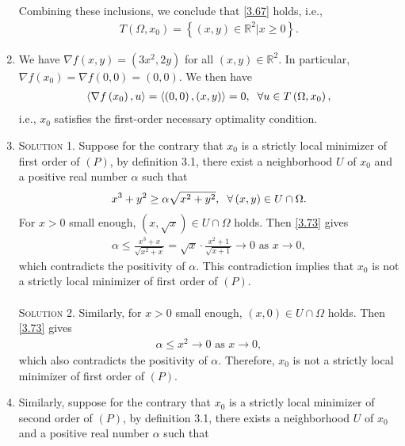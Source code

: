 \documentclass[a4paper]{article}
\numberwithin{equation}{section}
\begin{document}
\begin{enumerate}
\begin{enumerate}
\end{enumerate}
Combining these inclusions, we conclude that \eqref{3.67} holds, i.e.,
\begin{align}
T\left( {\Omega ,{x_0}} \right) = \left\{ {\left( {x,y} \right) \in {\mathbb{R}^2}|x \ge 0} \right\}.
\end{align}
\item We have $\nabla f\left( {x,y} \right) = \left( {3{x^2},2y} \right)$ for all $\left(x,y\right)\in \mathbb{R}^2$. In particular, $\nabla f\left( {{x_0}} \right) = \nabla f\left( {0,0} \right) = \left( {0,0} \right)$. We then have
\begin{align}
\left\langle {\nabla f\left( {{x_0}} \right),u} \right\rangle  = \left\langle {\left( {0,0} \right),\left( {x,y} \right)} \right\rangle  = 0,\hspace{0.2cm} \forall u\in T\left(\Omega,x_0\right),
\end{align}
i.e., $x_0$ satisfies the first-order necessary optimality condition.
\item \textsc{Solution 1.} Suppose for the contrary that $x_0$ is a strictly local minimizer of first order of $\left(P\right)$, by definition 3.1, there exist a neighborhood $U$ of $x_0$ and a positive real number $\alpha$ such that
\begin{align}
\label{3.73}
{x^3} + {y^2} \ge \alpha \sqrt {{x^2} + {y^2}} ,\hspace{0.2cm}\forall \left( {x,y} \right) \in U \cap \Omega .
\end{align}
For $x>0$ small enough, $\left( {x,\sqrt{x}} \right) \in U \cap \Omega $ holds. Then \eqref{3.73} gives
\begin{align}
\alpha  \le \frac{{{x^3} + x}}{{\sqrt {{x^2} + x} }} = \sqrt x \cdot \frac{{{x^2} + 1}}{{\sqrt {x + 1} }} \to 0\mbox{ as } x \to 0,
\end{align}
which contradicts the positivity of $\alpha$. This contradiction implies that $x_0$ is not a strictly local minimizer of first order of $\left(P\right)$.\\
\\
\textsc{Solution 2.} Similarly, for $x>0$ small enough, $\left( x,0 \right) \in U \cap \Omega $ holds. Then \eqref{3.73} gives
\begin{align}
\alpha  \le {x^2} \to 0 \mbox{ as } x \to 0,
\end{align}
which also contradicts the positivity of $\alpha$. Therefore, $x_0$ is not a strictly local minimizer of first order of $\left(P\right)$.
\item Similarly, suppose for the contrary that $x_0$ is a strictly local minimizer of second order of $\left(P\right)$, by definition 3.1, there exists a neighborhood $U$ of $x_0$ and a positive real number $\alpha$ such that

\end{enumerate}
\end{document}
